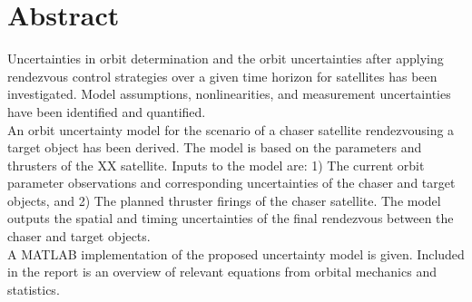 \section{Abstract}

Uncertainties in orbit determination and the orbit uncertainties after applying rendezvous control strategies over a given time horizon for satellites has been investigated. Model assumptions, nonlinearities, and measurement uncertainties have been identified and quantified. \\

An orbit uncertainty model for the scenario of a chaser satellite rendezvousing a target object has been derived. The model is based on the parameters and thrusters of the XX satellite. Inputs to the model are: 1) The current orbit parameter observations and corresponding uncertainties of the chaser and target objects, and 2) The planned thruster firings of the chaser satellite. The model outputs the spatial and timing uncertainties of the final rendezvous between the chaser and target objects. \\

A MATLAB implementation of the proposed uncertainty model is given. Included in the report is an overview of relevant equations from orbital mechanics and statistics. \\